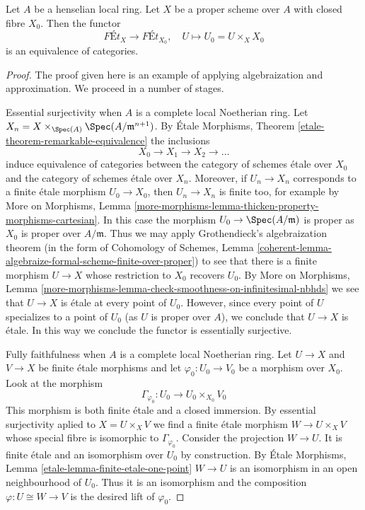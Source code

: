 \begin{lemma}
\label{lemma-finite-etale-on-proper-over-henselian}
Let $A$ be a henselian local ring. Let $X$ be a proper scheme over $A$
with closed fibre $X_0$. Then the functor
$$
\textit{F\'Et}_X \to \textit{F\'Et}_{X_0},\quad
U \longmapsto U_0 = U \times_X X_0
$$
is an equivalence of categories.
\end{lemma}

\begin{proof}
The proof given here is an example of applying algebraization and
approximation. We proceed in a number of stages.

\medskip\noindent
Essential surjectivity when $A$ is a complete local Noetherian ring.
Let $X_n = X \times_{\Spec(A)} \Spec(A/\mathfrak m^{n + 1})$.
By \'Etale Morphisms, Theorem \ref{etale-theorem-remarkable-equivalence}
the inclusions
$$
X_0 \to X_1 \to X_2 \to \ldots
$$
induce equivalence of categories between the category
of schemes \'etale over $X_0$ and the category of schemes
\'etale over $X_n$.
Moreover, if $U_n \to X_n$ corresponds to a finite \'etale
morphism $U_0 \to X_0$, then $U_n \to X_n$ is finite too, for example
by More on Morphisms, Lemma
\ref{more-morphisms-lemma-thicken-property-morphisms-cartesian}.
In this case the morphism $U_0 \to \Spec(A/\mathfrak m)$
is proper as $X_0$ is proper over $A/\mathfrak m$. Thus we may apply
Grothendieck's algebraization theorem
(in the form of
Cohomology of Schemes, Lemma
\ref{coherent-lemma-algebraize-formal-scheme-finite-over-proper})
to see that there is a finite morphism $U \to X$ whose restriction
to $X_0$ recovers $U_0$. By More on Morphisms, Lemma
\ref{more-morphisms-lemma-check-smoothness-on-infinitesimal-nbhds}
we see that $U \to X$ is \'etale at every point of $U_0$.
However, since every point of $U$ specializes to a point of $U_0$
(as $U$ is proper over $A$), we conclude that $U \to X$ is \'etale.
In this way we conclude the functor is essentially surjective.

\medskip\noindent
Fully faithfulness when $A$ is a complete local Noetherian ring.
Let $U \to X$ and $V \to X$ be finite \'etale morphisms and
let $\varphi_0 : U_0 \to V_0$ be a morphism over $X_0$. Look at
the morphism
$$
\Gamma_{\varphi_0} : U_0 \longrightarrow U_0 \times_{X_0} V_0
$$
This morphism is both finite \'etale and a closed immersion.
By essential surjectivity aplied to $X = U \times_X V$ we find
a finite \'etale morphism $W \to U \times_X V$ whose special
fibre is isomorphic to $\Gamma_{\varphi_0}$. Consider the projection
$W \to U$. It is finite \'etale and an isomorphism over $U_0$ by
construction. By \'Etale Morphisms, Lemma
\ref{etale-lemma-finite-etale-one-point}
$W \to U$ is an isomorphism in an open neighbourhood of $U_0$.
Thus it is an isomorphism and the composition $\varphi : U \cong W \to V$
is the desired lift of $\varphi_0$.


\end{proof}
